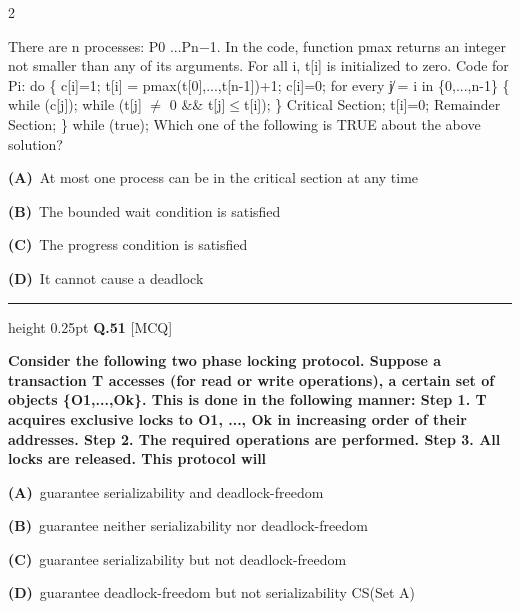 \documentclass[a4paper,10pt,twoside]{article}
\begin{document}
\begin{multicols}{2}
{There are n
processes: P0 ...Pn−1. In the code, function pmax returns an integer not smaller than any
of its arguments. For all i, t[i] is initialized to zero.
Code for Pi:
do \{
c[i]=1; t[i] = pmax(t[0],...,t[n-1])+1; c[i]=0;
for every j̸ = i in \{0,...,n-1\} \{
while (c[j]);
while (t[j] $\ne$ 0 \&\& t[j]$\le$t[i]);
\}
Critical Section;
t[i]=0;
Remainder Section;
\} while (true);
Which one of the following is TRUE about the above solution? \par}
\par\vspace{2pt}\noindent
\textbf{(A)}~At most one process can be in the critical section at any time\par\vspace{2pt}\noindent
\textbf{(B)}~The bounded wait condition is satisﬁed\par\vspace{2pt}\noindent
\textbf{(C)}~The progress condition is satisﬁed\par\vspace{2pt}\noindent
\textbf{(D)}~It cannot cause a deadlock
\par\vspace{6pt}\hrule height 0.25pt\vspace{6pt}
\noindent\textbf{Q.51} \hfill {\footnotesize\textsf{[MCQ]}}
\par\vspace{2pt}
{\bfseries Consider the following two phase locking protocol. Suppose a transaction T accesses (for
read or write operations), a certain set of objects \{O1,...,Ok\}. This is done in the following
manner:
Step 1. T acquires exclusive locks to O1, ..., Ok in increasing order of their addresses.
Step 2. The required operations are performed.
Step 3. All locks are released.
This protocol will \par}
\par\vspace{2pt}\noindent
\textbf{(A)}~guarantee serializability and deadlock-freedom\par\vspace{2pt}\noindent
\textbf{(B)}~guarantee neither serializability nor deadlock-freedom\par\vspace{2pt}\noindent
\textbf{(C)}~guarantee serializability but not deadlock-freedom\par\vspace{2pt}\noindent
\textbf{(D)}~guarantee deadlock-freedom but not serializability \newline CS(Set A)

\end{multicols}
\end{document}
